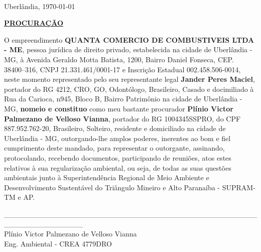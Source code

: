 \documentclass[12pt,a4paper,oneside,sumario=tradicional,brazil]{abntex2}
\begin{document}
	\textual
	\pagestyle{LRA}
	
	\
	
	\begin{flushright}
		Uberlândia, \today
	\end{flushright}
	
	
	\begin{center}
		{\LARGE \underline{\textbf{PROCURAÇÃO}}}
	\end{center}
	
	\noindent
	O empreendimento \textbf{QUANTA COMERCIO DE COMBUSTIVEIS LTDA - ME}, pessoa jurídica de direito privado, estabelecida na cidade de Uberlândia - MG, à Avenida Geraldo Motta Batista, 1200, Bairro Daniel Fonseca, CEP. 38400–316, CNPJ 21.331.461/0001-17 e Inscrição Estadual 002.458.506-0014, neste momento representado pelo seu representante legal 
	\textbf{Jander Peres Maciel}, 
	portador do RG 4212, CRO, GO, Odontólogo, Brasileiro, Casado e docimiliado à Rua da Carioca, n945, Bloco B, Bairro Patrimônio na cidade de Uberlândia - MG, 
	\textbf{nomeio e constituo} 
	como meu bastante procurador 
	\textbf{Plínio Victor Palmezano de Velloso Vianna}, 
	portador do RG 1004345SSPRO, do CPF 887.952.762-20, Brasileiro, Solteiro, residente e domiciliado na cidade de Uberlândia - MG, 
	outorgando-lhe amplos poderes, inerentes ao bom e fiel cumprimento deste mandado, para representar o outorgante, assinando, protocolando, recebendo documentos, participando de reuniões, atos estes  relativos à sua regularização ambiental, ou seja, de todas as suas questões ambientais junto à Superintendência Regional de Meio Ambiente e Desenvolvimento Sustentável do Triângulo Mineiro e Alto Paranaíba - SUPRAM-TM e AP.
	
	\begin{center}
		\_\_\_\_\_\_\_\_\_\_\_\_\_\_\_\_\_\_\_\_\_\_\_\_\_\_\_\_\_\_\_\_\_\_\_\_\_\_\_\_\_\_\_\_\_\_\_\_\_\_\_\_\_\_\_\_\_\_\_\_\_\_\_ \\
		Plínio Victor Palmezano de Velloso Vianna \\
		Eng. Ambiental - CREA 4779DRO \\
	\end{center}
	
	
\end{document}
